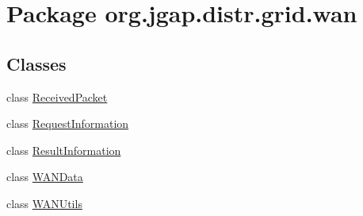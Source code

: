 \hypertarget{namespaceorg_1_1jgap_1_1distr_1_1grid_1_1wan}{\section{Package org.\-jgap.\-distr.\-grid.\-wan}
\label{namespaceorg_1_1jgap_1_1distr_1_1grid_1_1wan}
}
\subsection*{Classes}
\begin{DoxyCompactItemize}
\item 
class \hyperlink{classorg_1_1jgap_1_1distr_1_1grid_1_1wan_1_1_received_packet}{Received\-Packet}
\item 
class \hyperlink{classorg_1_1jgap_1_1distr_1_1grid_1_1wan_1_1_request_information}{Request\-Information}
\item 
class \hyperlink{classorg_1_1jgap_1_1distr_1_1grid_1_1wan_1_1_result_information}{Result\-Information}
\item 
class \hyperlink{classorg_1_1jgap_1_1distr_1_1grid_1_1wan_1_1_w_a_n_data}{W\-A\-N\-Data}
\item 
class \hyperlink{classorg_1_1jgap_1_1distr_1_1grid_1_1wan_1_1_w_a_n_utils}{W\-A\-N\-Utils}
\end{DoxyCompactItemize}
